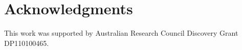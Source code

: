 \documentclass[review,draft,12pt]{elsarticle}
\begin{document}
\section{Acknowledgments}\label{acknowledgments}

This work was supported by Australian Research Council Discovery Grant
DP110100465.

\clearpage


\listoffigures
\end{document}
